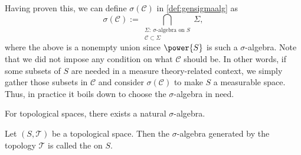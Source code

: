 Having proven this,
we can define \(\sigma(\mathcal C)\) in \cref{def:gensigmaalg} as
\[
    \sigma(\mathcal C)
    :=\bigcap_{\substack{
        \Sigma:\ \text{\(\sigma\)-algebra on \(S\)} \\
        \mathcal C\subset\Sigma}}\Sigma,
\]
where the above is a nonempty union since
\(\power{S}\) is such a \(\sigma\)-algebra.
Note that
we did not impose any condition on what \(\mathcal C\) should be.
In other words,
if some subsets of \(S\) are needed in a measure theory-related context,
we simply gather those subsets in \(\mathcal C\)
and consider \(\sigma(\mathcal C)\) to make \(S\) a measurable space.
Thus, in practice it boils down to choose the \(\sigma\)-algebra in need.

For topological spaces, there exists a natural \(\sigma\)-algebra.

\begin{definition}
    \label{def:borelsig}
    Let \((S,\mathcal T)\) be a topological space.
    Then the \(\sigma\)-algebra generated by the topology \(\mathcal T\)
    is called the  on \(S\).
\end{definition}